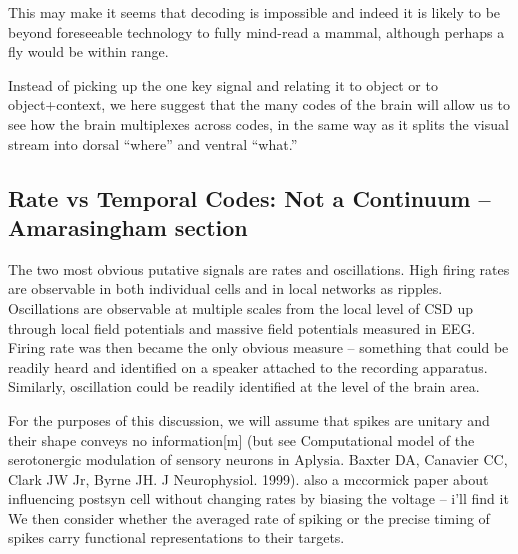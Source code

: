 \documentclass[12pt]{article}
\begin{document}
This may make it seems that decoding is impossible and indeed it is likely to be beyond foreseeable technology to fully mind-read a mammal, although perhaps a fly would be within range.

Instead of picking up the one key signal and relating it to object or to object+context, we here suggest that the many codes of the brain will allow us to see how the brain
multiplexes across codes, in the same way as it splits the visual stream into dorsal “where” and ventral “what.”

\subsection{Rate vs Temporal Codes: Not a Continuum -- Amarasingham section}

The two most obvious putative signals are rates and oscillations.
High firing rates are observable in both individual cells and in local networks as ripples. Oscillations are observable at multiple scales from the local level of CSD up
through local field potentials and massive field potentials measured in EEG.
Firing rate was then became the only obvious measure -- something that could be readily heard and identified on a speaker attached to the recording apparatus. Similarly,
oscillation could be readily identified at the level of the brain area.

For the purposes of this discussion, we will assume that spikes are unitary and their shape conveys no information[m] (but see Computational model of the serotonergic
modulation of sensory neurons in Aplysia. Baxter DA, Canavier CC, Clark JW Jr, Byrne JH. J Neurophysiol. 1999). 
also a mccormick paper about influencing postsyn cell without changing rates by biasing the voltage -- i'll find it
We then consider whether the averaged rate of spiking or the
precise timing of spikes carry functional representations to their targets.
 
\end{document}
